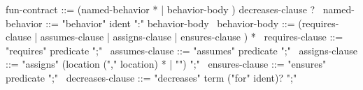 \begin{syntax}
  fun-contract ::= (named-behavior * | behavior-body ) decreases-clause ? 
  \
  named-behavior ::= "behavior" ident ":" behavior-body 
  \
  behavior-body ::= (requires-clause | assumes-clause | assigns-clause |
              ensures-clause ) * 
              \
  requires-clause ::= "requires" predicate ";"
  \
  assumes-clause ::= "assumes" predicate ";"
  \
  assigns-clause ::= "assigns" (location ("," location) * |
  "\nothing") ";"
  \
  ensures-clause ::= "ensures" predicate ";"
  \
  decreases-clause ::= "decreases" term ("for" ident)? ";"
\end{syntax}
